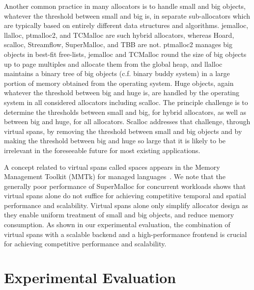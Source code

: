 \documentclass[10pt]{sigplanconf}
\begin{document}
Another common practice in many allocators is to handle small and big objects,
whatever the threshold between small and big is, in separate sub-allocators
which are typically based on entirely different data structures and algorithms.
jemalloc, llalloc, ptmalloc2, and TCMalloc are such hybrid allocators,
whereas Hoard, scalloc, Streamflow, SuperMalloc, and TBB are not. ptmalloc2 manages big
objects in best-fit free-lists, jemalloc and TCMalloc round the size of big
objects up to page multiples and allocate them from the global heap, and llalloc
maintains a binary tree of big objects (c.f. binary buddy system) in a
large portion of memory obtained from the operating system. Huge objects, again
whatever the threshold between big and huge is, are handled by the operating
system in all considered allocators including scalloc. The principle challenge
is to determine the thresholds between small and big, for hybrid allocators, as
well as between big and huge, for all allocators. Scalloc addresses that
challenge, through virtual spans, by removing the threshold between small and
big objects and by making the threshold between big and huge so large that it is
likely to be irrelevant in the foreseeable future for most existing
applications.

A concept related to virtual spans called spaces appears in the Memory Management Toolkit (MMTk) for managed languages~\cite{Blackburn:ICSE04}.
We note that the generally poor performance of 
SuperMalloc for concurrent workloads shows that virtual spans alone do not suffice for achieving competitive temporal and spatial performance and scalability. Virtual spans alone only simplify allocator design as they enable uniform treatment of small and big objects, and reduce memory consumption. As shown in our experimental evaluation, the combination of virtual spans
with a scalable backend  and a high-performance frontend is crucial for
achieving competitive performance and scalability. 



\section{Experimental Evaluation}\label{sec:experiments}
\end{document}
